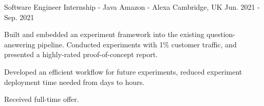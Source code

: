 

\begin{cventries}


  \cventry
    {Software Engineer Internship - Java} %
    {Amazon - Alexa} %
    {Cambridge, UK} %
    {Jun. 2021 - Sep. 2021} %
    {
      \begin{cvitems} %
        \item {Built and embedded an experiment framework into the existing question-answering pipeline. Conducted experiments with 1\% customer traffic, and presented a highly-rated proof-of-concept report.}
        \item {Developed an efficient workflow for future experiments, reduced experiment deployment time needed from days to hours.} %
        \item {Received full-time offer.}
      \end{cvitems}
    }


\end{cventries}
